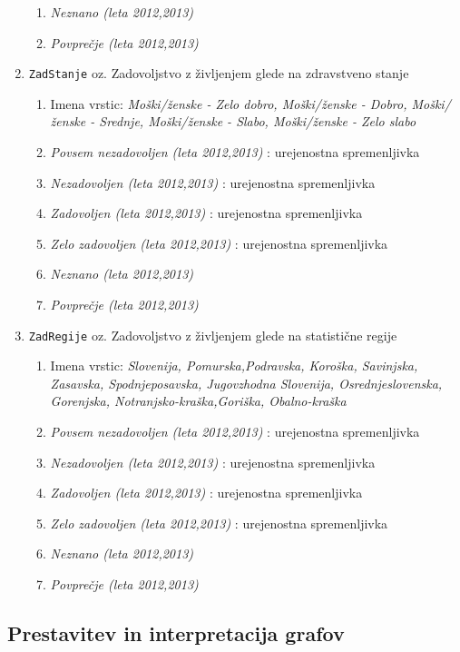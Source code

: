 \documentclass[11pt,a4paper]{article}
\begin{document}
\begin{enumerate}
\begin{enumerate}
\item \textit{Neznano (leta 2012,2013)} 
\item \textit{Povprečje (leta 2012,2013)} 
\end{enumerate}
\item \verb+ZadStanje+ oz. Zadovoljstvo z življenjem glede na zdravstveno stanje
\begin{enumerate}
\item Imena vrstic: \textit{Moški/ženske - Zelo dobro, Moški/ženske - Dobro, Moški/ženske - Srednje, Moški/ženske - Slabo, Moški/žen\-ske - Zelo slabo}
\item \textit{Povsem nezadovoljen (leta 2012,2013)} : urejenostna spremenljivka
\item \textit{Nezadovoljen (leta 2012,2013)} : urejenostna spremenljivka
\item \textit{Zadovoljen (leta 2012,2013)} : urejenostna spremenljivka
\item \textit{Zelo zadovoljen (leta 2012,2013)} : urejenostna spremenljivka
\item \textit{Neznano (leta 2012,2013)} 
\item \textit{Povprečje (leta 2012,2013)} 
\end{enumerate}
\item \verb+ZadRegije+ oz. Zadovoljstvo z življenjem glede na statistične regije
\begin{enumerate}
\item Imena vrstic: \textit{Slovenija, Pomurska,Podravska, Koroška, Savinjska, Zasavska, Spodnjeposavska, Jugovzhodna Slovenija, Osrednjeslovenska, Gorenjska, Notranjsko-kraška,Goriška, O\-bal\-no-kraška}
\item \textit{Povsem nezadovoljen (leta 2012,2013)} : urejenostna spremenljivka
\item \textit{Nezadovoljen (leta 2012,2013)} : urejenostna spremenljivka
\item \textit{Zadovoljen (leta 2012,2013)} : urejenostna spremenljivka
\item \textit{Zelo zadovoljen (leta 2012,2013)} : urejenostna spremenljivka
\item \textit{Neznano (leta 2012,2013)} 
\item \textit{Povprečje (leta 2012,2013)} 
\end{enumerate}
\end{enumerate}

\subsection{Prestavitev in interpretacija grafov}

\end{document}
